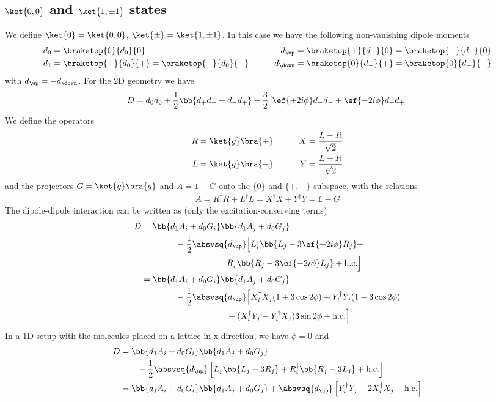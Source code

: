\subsection{$\ket{0,0}$ and $\ket{1,\pm 1}$ states}
We define $\ket{0}=\ket{0,0}$, $\ket{\pm}=\ket{1,\pm 1}$. In this case we have the following non-vanishing dipole moments
\begin{align*}
d_0 &= \braketop{0}{d_0}{0}&\qquad
d_{\up} &= \braketop{+}{d_+}{0}=\braketop{-}{d_-}{0}\\
d_1 &= \braketop{+}{d_0}{+} = \braketop{-}{d_0}{-} &\qquad d_{\down} &= \braketop{0}{d_-}{+}=\braketop{0}{d_+}{-}
\end{align*}
with $d_\up = -d_\down$.
For the 2D geometry we have
\begin{align*}
D = d_0 d_0 + \frac{1}{2}\bb{d_+ d_- + d_- d_+} -\frac{3}{2} \left[ \ef{+2i\phi} d_- d_- + \ef{-2i\phi} d_+ d_+\right]
\end{align*}
We define the operators
\begin{align*}
R&=\ket{g}\bra{+}&\qquad X&=\frac{L-R}{\sqrt{2}}\\
L&=\ket{g}\bra{-}&\qquad Y&=\frac{L+R}{\sqrt{2}}
\end{align*}
and the projectors $G=\ket{g}\bra{g}$ and $A=1-G$ onto the $\{0\}$ and $\{+,-\}$ subspace, with the relations
\begin{align*}
A = R^\dagger R + L^\dagger L = X^\dagger X + Y^\dagger Y=\mathds{1}-G
\end{align*}
The dipole-dipole interaction can be written as (only the excitation-conserving terms)
\begin{align}
D &=  \bb{d_1 A_i + d_0 G_i} \bb{d_1 A_j + d_0 G_j}\nonumber\\
&\qquad\qquad-\frac{1}{2}\absvsq{d_\up} \Big[ L_i^\dagger \bb{L_j-3\ef{+2i\phi}R_j}+\\
&\qquad\qquad\qquad\qquad\qquad R_i^\dagger\bb{R_j-3\ef{-2i\phi}L_j} + \text{h.c.} \Big]\nonumber\\
&=\bb{d_1 A_i + d_0 G_i} \bb{d_1 A_j + d_0 G_j} \nonumber\\
&\qquad\qquad-\frac{1}{2}\absvsq{d_\up} \Big[ X_i^\dagger X_j (1+3\cos 2\phi) +Y_i^\dagger Y_j (1-3\cos 2 \phi)\nonumber\\
&\qquad\qquad\qquad\qquad\qquad  + (X_i^\dagger Y_j - Y_i^\dagger X_j)3 \sin 2\phi + \text{h.c.} \nonumber\Big]
\end{align}
In a 1D setup with the molecules placed on a lattice in x-direction, we have $\phi=0$ and
\begin{align*}
D &=  \bb{d_1 A_i + d_0 G_i} \bb{d_1 A_j + d_0 G_j}\\
&\qquad -\frac{1}{2}\absvsq{d_\up} \left[L_i^\dagger\bb{L_j-3R_j}+R_i^\dagger\bb{R_j-3L_j}+\text{h.c.}\right]\\
 &=  \bb{d_1 A_i + d_0 G_i} \bb{d_1 A_j + d_0 G_j}
+\absvsq{d_\up} \left[Y_i^\dagger Y_j - 2X_i^\dagger X_j+\text{h.c.}\right]
\end{align*}
